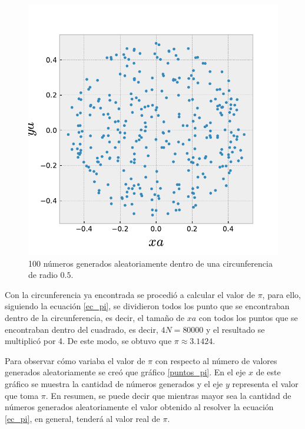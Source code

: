 \documentclass[../portafolio.tex]{subfiles}
\begin{document}
\begin{figure}[h]
    \centering
    \includegraphics[scale=0.8]{tex/img/circunf_pi.pdf}
    \caption{ 100 números generados aleatoriamente dentro de una circunferencia de radio $0.5$.}
    \label{aleatorio_circunf}
\end{figure}

\vspace{2mm}
Con la circunferencia ya encontrada se procedió a calcular el valor de $\pi$, para ello, siguiendo la ecuación \ref{ec_pi}, se dividieron todos los punto que se encontraban dentro de la circunferencia, es decir, el tamaño de $xa$ con todos los puntos que se encontraban dentro del cuadrado, es decir, $4N=80000$ y el resultado se multiplicó por 4. De este modo, se obtuvo que $\pi \approx 3.1424$.

\vspace{2mm}
Para observar cómo variaba el valor de $\pi$ con respecto al número de valores generados aleatoriamente se creó que gráfico \ref{puntos_pi}. En el eje $x$ de este gráfico se muestra la cantidad de números generados y el eje $y$ representa el valor que toma $\pi$. En resumen, se puede decir que mientras mayor sea la cantidad de números generados aleatoriamente el valor obtenido al resolver la ecuación \ref{ec_pi}, en general, tenderá al valor real de $\pi$. 
\end{document}
